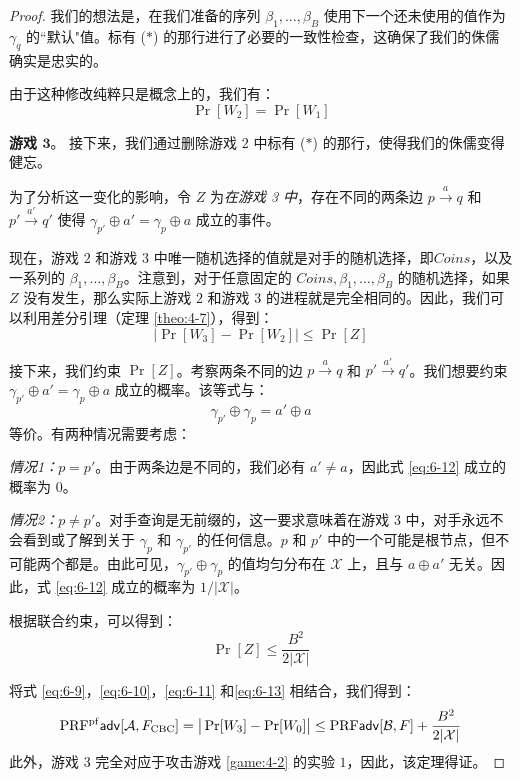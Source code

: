 \begin{proof}
\vspace{8pt}

\noindent
我们的想法是，在我们准备的序列 $\beta_1,\dots,\beta_B$ 使用下一个还未使用的值作为 $\gamma_q$ 的``默认"值。标有 ($*$) 的那行进行了必要的一致性检查，这确保了我们的侏儒确实是忠实的。

由于这种修改纯粹只是概念上的，我们有：
\begin{equation}\label{eq:6-10}
\Pr[W_2]=\Pr[W_1]
\end{equation}

\textbf{游戏 $\mathbf{3}$}。
接下来，我们通过删除游戏 $2$ 中标有 ($*$) 的那行，使得我们的侏儒变得健忘。

为了分析这一变化的影响，令 $Z$ 为\emph{在游戏 3 中}，存在不同的两条边 $p\overset{a}\rightarrow q$ 和 $p'\overset{a'}\rightarrow q'$ 使得 $\gamma_{p'}\oplus a'=\gamma_p\oplus a$ 成立的事件。

现在，游戏 $2$ 和游戏 $3$ 中唯一随机选择的值就是对手的随机选择，即$Coins$，以及一系列的 $\beta_1,\dots,\beta_B$。注意到，对于任意固定的 $Coins,\beta_1,\dots,\beta_B$ 的随机选择，如果 $Z$ 没有发生，那么实际上游戏 $2$ 和游戏 $3$ 的进程就是完全相同的。因此，我们可以利用差分引理（定理 \ref{theo:4-7}），得到：
\begin{equation}\label{eq:6-11}
\big\lvert\Pr[W_3]-\Pr[W_2]\big\rvert\leq\Pr[Z]
\end{equation}

接下来，我们约束 $\Pr[Z]$。考察两条不同的边 $p\overset{a}\rightarrow q$ 和 $p'\overset{a'}\rightarrow q'$。我们想要约束 $\gamma_{p'}\oplus a'=\gamma_p\oplus a$ 成立的概率。该等式与：
\begin{equation}\label{eq:6-12}
\gamma_{p'}\oplus\gamma_p =a'\oplus a
\end{equation}
等价。有两种情况需要考虑：

\emph{情况1：}$p=p'$。由于两条边是不同的，我们必有 $a'\neq a$，因此式 \ref{eq:6-12} 成立的概率为 $0$。

\emph{情况2：}$p\neq p'$。对手查询是无前缀的，这一要求意味着在游戏 $3$ 中，对手永远不会看到或了解到关于 $\gamma_p$ 和 $\gamma_{p'}$ 的任何信息。$p$ 和 $p'$ 中的一个可能是根节点，但不可能两个都是。由此可见，$\gamma_{p'}\oplus\gamma_p$ 的值均匀分布在 $\mathcal{X}$ 上，且与 $a\oplus a'$ 无关。因此，式 \ref{eq:6-12} 成立的概率为 ${1}/{|\mathcal{X}|}$。

根据联合约束，可以得到：
\begin{equation}\label{eq:6-13}
\Pr[Z]\leq\frac{B^2}{2|\mathcal{X}|}
\end{equation}

将式 \ref{eq:6-9}，\ref{eq:6-10}，\ref{eq:6-11} 和\ref{eq:6-13} 相结合，我们得到：
\begin{equation}\label{eq:6-14}
{\rm PRF^{pf}}\mathsf{adv}[\mathcal{A},F_{\rm CBC}]=
\big\lvert\Pr[W_3]-\Pr[W_0]\big\rvert\leq{\rm PRF}\mathsf{adv}[\mathcal{B},F]+\frac{B^2}{2|\mathcal{X}|}
\end{equation}
此外，游戏 $3$ 完全对应于攻击游戏 \ref{game:4-2} 的实验 $1$，因此，该定理得证。
\end{proof}

